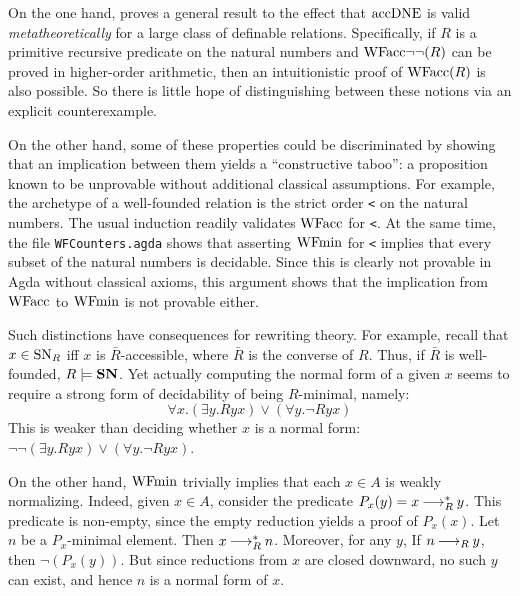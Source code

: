 On the one hand, \cite{Berardi} proves a general result to the effect that
$\mathrm{accDNE}$ is valid \emph{metatheoretically} for a large class of definable relations.
Specifically, if $R$ is a primitive recursive predicate on the natural numbers and
$\mathrm{WFacc}{\lnot\lnot}(R)$ can be proved in higher-order arithmetic, then an intuitionistic proof 
of $\mathrm{WFacc}(R)$ is also possible.
So there is little hope of distinguishing between these notions via an explicit counterexample.

On the other hand, some of these properties could be discriminated
by showing that an implication between them yields a ``constructive taboo'':
a proposition known to be unprovable without additional classical assumptions.
For example, the archetype of a well-founded relation is the strict order \verb|<|
on the natural numbers.  The usual induction readily validates $\mathrm{WFacc}$ for \verb|<|.
  At the same time, the file \texttt{WFCounters.agda} shows that
asserting $\mathrm{WFmin}$ for \verb|<| implies that every subset of the natural numbers is decidable.
Since this is clearly not provable in Agda without classical axioms,
this argument shows that the implication from $\mathrm{WFacc}$ to $\mathrm{WFmin}$ is not provable either.

Such distinctions have consequences for rewriting theory.
For example, recall that $x\in \mathrm{SN}_R$ iff $x$ is $\bar{R}$-accessible, where $\bar{R}$ 
is the converse of $R$.  Thus, if $\bar{R}$ is well-founded, $R \models \mathbf{SN}$.
Yet actually computing the normal form of a given $x$ seems to require a
strong form of decidability of being $R$-minimal, namely:
\[
\tag{$\isMinDec$} \forall x. \left(\exists y. Ryx\right) \lor \left(\forall y. \lnot Ryx\right)
\]
This is weaker than deciding whether $x$ is a normal form:
$\lnot\lnot\left(\exists y. Ryx\right) \lor \left(\forall y. \lnot Ryx\right)$.

On the other hand, $\mathrm{WFmin}$ trivially implies that each $x \in A$ is weakly normalizing.
Indeed, given $x \in A$, consider the predicate $P_x(y) = x \mathbin{\longrightarrow_R^*} y$.
This predicate is non-empty, since the empty reduction yields a proof of $P_x(x)$.
Let $n$ be a $P_x$-minimal element.  Then $x \mathbin{\longrightarrow_R^*} n$.  Moreover, for any $y$,
If $n \mathbin{\longrightarrow_R} y$, then $\lnot(P_x(y))$.  But since reductions from $x$ are closed downward,
no such $y$ can exist, and hence $n$ is a normal form of $x$.

